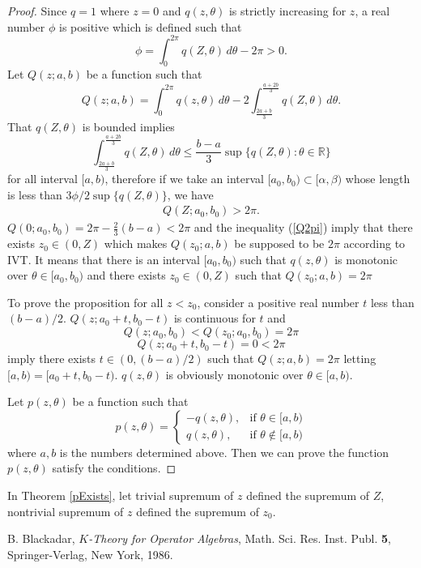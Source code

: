 \documentclass{kms-j}
\theoremstyle{plain}
\theoremstyle{definition}
\theoremstyle{remark}
\begin{document}
\begin{proof}
Since $q=1$ where $z=0$ and $q(z,\theta)$ is strictly increasing for $z$, a real number $\phi$ is positive which is defined such that
$$\phi=\int_0 ^{2\pi} q(Z,\theta)\,d\theta-2\pi>0.$$
Let $Q(z;a,b)$ be a function such that
$$Q(z;a,b)=\int_0^{2\pi} q(z,\theta)\,d\theta-2\int_{\frac{2a+b}3}^{\frac{a+2b}3} q(Z,\theta)\,d\theta.$$
That $q(Z,\theta)$ is bounded implies
$$\int_{\frac{2a+b}3}^{\frac{a+2b}3} q(Z,\theta)\,d\theta\le\frac{b-a}3\sup\{q(Z,\theta):\theta\in{\mathbb R}\}$$
for all interval $[a,b)$, therefore if we take an interval $[a_0,b_0)\subset[\alpha,\beta)$ whose length is less than $3\phi/2\sup\{q(Z,\theta)\}$, we have
\begin{eqnarray}\label{Q2pi}
Q(Z;a_0,b_0)>2\pi.
\end{eqnarray}
$Q(0;a_0,b_0)=2\pi-\frac23(b-a)<2\pi$ and the inequality (\ref{Q2pi}) imply that there exists $z_0\in(0,Z)$ which makes $Q(z_0;a,b)$ be supposed to be $2\pi$ according to IVT.
It means that there is an interval $[a_0,b_0)$ such that $q(z,\theta)$ is monotonic over $\theta\in[a_0,b_0)$ and there exists $z_0\in(0,Z)$ such that $Q(z_0;a,b)=2\pi$

To prove the proposition for all $z<z_0$, consider a positive real number $t$ less than $(b-a)/2$.
$Q(z;a_0+t,b_0-t)$ is continuous for $t$ and
$$Q(z;a_0,b_0)<Q(z_0;a_0,b_0)=2\pi$$
$$Q(z;a_0+t,b_0-t)=0<2\pi$$
imply there exists $t\in(0,(b-a)/2)$ such that $Q(z;a,b)=2\pi$ letting $[a,b)=[a_0+t,b_0-t)$. $q(z,\theta)$ is obviously monotonic over $\theta\in[a,b)$.

Let $p(z,\theta)$ be a function such that
$$p(z,\theta)=
\begin{cases}
-q(z,\theta), & {\text{if }}\theta\in[a,b) \\
q(z,\theta), & {\text{if }}\theta\not\in[a,b)
\end{cases}
$$
where $a,b$ is the numbers determined above.
Then we can prove the function $p(z,\theta)$ satisfy the conditions.
\end{proof}

In Theorem \ref{pExists}, let trivial supremum of $z$ defined the supremum of $Z$, nontrivial supremum of $z$ defined the supremum of $z_0$.

\begin{thebibliography}{99}

 B. Blackadar, {\it $K$-Theory for Operator Algebras}, Math. Sci. Res. Inst. Publ. {\bf 5}, Springer-Verlag, New York, 1986.

\end{thebibliography}
\end{document}
